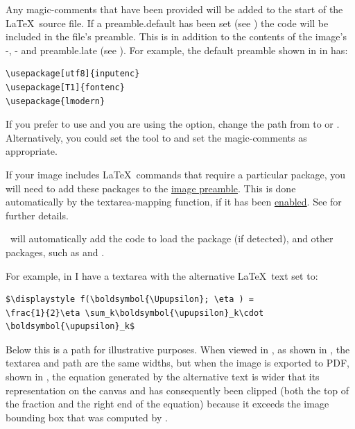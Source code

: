Any \glspl{magic-comment} that have been provided will be added to
the start of the \LaTeX\ source file.  If a \gls{preamble.default}
has been set (see ) the code will
be included in the  file's preamble.  This is in addition
to the contents of the image's -,
- and \gls{preamble.late} (see
). For example, the default preamble shown in
 in  has:
\begin{verbatim}
\usepackage[utf8]{inputenc}
\usepackage[T1]{fontenc}
\usepackage{lmodern}
\end{verbatim}
If you prefer to use  and you are using the
 option, change the
 path from  to
 or . Alternatively, you could set the
 tool to  and set the
\glspl{magic-comment} as appropriate.

If your image includes \LaTeX\ commands that require a particular
package, you will need to add these packages to the
\hyperref[sec:preamblepanels]{image preamble}. This is done automatically
by the \gls{textarea-mapping} function, if it has been
\hyperref[mi:texmappings]{enabled}.  See
 for further details.

\FlowframTk\ will automatically add
the code to load the  package (if detected),
and other packages, such as  and .


For example, in  I have a \gls{textarea} with the
alternative \LaTeX\ text set to:
\begin{verbatim}
$\displaystyle f(\boldsymbol{\Upupsilon}; \eta ) = 
\frac{1}{2}\eta \sum_k\boldsymbol{\upupsilon}_k\cdot 
\boldsymbol{\upupsilon}_k$
\end{verbatim}
Below this is a \gls{path} for illustrative purposes. When viewed in
\FlowframTk, as shown in , the
\gls*{textarea} and \gls*{path} are the same widths, but when the
image is exported to PDF, shown in , the
equation generated by the alternative text is wider that its
representation on the \gls{canvas} and has consequently been clipped
(both the top of the fraction and the right end of the equation)
because it exceeds the image bounding box that was computed by
\FlowframTk.

